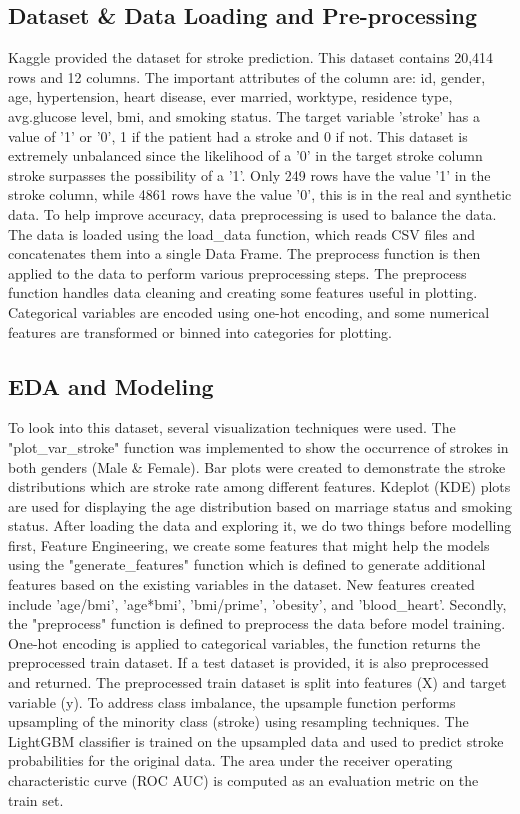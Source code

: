 \documentclass{article}
\begin{document}
\subsection{Dataset \& Data Loading and Pre-processing}
\label{headings}
Kaggle provided the dataset for stroke prediction. This dataset contains 20,414 rows and 12 columns. The important attributes of the column are: id, gender, age, hypertension, heart disease, ever married, worktype, residence type, avg.glucose level, bmi, and smoking status. The target variable 'stroke' has a value of '1' or '0', 1 if the patient had a stroke and 0 if not. This dataset is extremely unbalanced since the likelihood of a '0' in the target stroke column stroke surpasses the possibility of a '1'. Only 249 rows have the value '1' in the stroke column, while 4861 rows have the value '0', this is in the real and synthetic data. To help improve  accuracy, data preprocessing is used to balance the data.\\
The data is loaded using the load\_data function, which reads CSV files and concatenates them into a single Data Frame. The preprocess function is then applied to the data to perform various preprocessing steps. The preprocess function handles data cleaning and creating some features useful in plotting. Categorical variables are encoded using one-hot encoding, and some numerical features are transformed or binned into categories for plotting.

\subsection{EDA and Modeling }
To look into this dataset, several visualization techniques were used. The "plot\_var\_stroke" function was implemented to show the occurrence of strokes in both genders (Male & Female). Bar plots were created to demonstrate the stroke distributions which are stroke rate among different features. Kdeplot (KDE) plots are used for displaying the age distribution based on marriage status and smoking status.
After loading the data and exploring it, we do two things before modelling first, Feature Engineering, we create some features that might help the models using the "generate\_features" function which is defined to generate additional features based on the existing variables in the dataset. New features created include 'age/bmi', 'age*bmi', 'bmi/prime', 'obesity', and 'blood\_heart'. Secondly, the "preprocess" function is defined to preprocess the data before model training. One-hot encoding is applied to categorical variables, the function returns the preprocessed train dataset. If a test dataset is provided, it is also preprocessed and returned.
The preprocessed train dataset is split into features (X) and target variable (y). To address class imbalance, the upsample function performs upsampling of the minority class (stroke) using resampling techniques. The LightGBM classifier is trained on the upsampled data and used to predict stroke probabilities for the original data. The area under the receiver operating characteristic curve (ROC AUC) is computed as an evaluation metric on the train set.
\\
\end{document}
